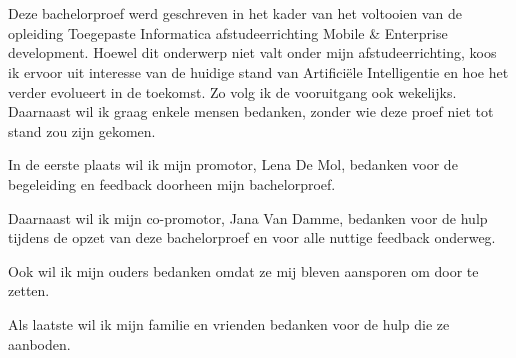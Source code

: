 
\chapter*{}%
\label{ch:voorwoord}


Deze bachelorproef werd geschreven in het kader van het voltooien van de opleiding Toegepaste Informatica afstudeerrichting Mobile \& Enterprise development. Hoewel dit onderwerp niet valt onder mijn afstudeerrichting, koos ik ervoor uit interesse van de huidige stand van Artificiële Intelligentie en hoe het verder evolueert in de toekomst. Zo volg ik de vooruitgang ook wekelijks. Daarnaast wil ik graag enkele mensen bedanken, zonder wie deze proef niet tot stand zou zijn gekomen.

In de eerste plaats wil ik mijn promotor, Lena De Mol, bedanken voor de begeleiding en feedback doorheen mijn bachelorproef.

Daarnaast wil ik mijn co-promotor, Jana Van Damme, bedanken voor de hulp tijdens de opzet van deze bachelorproef en voor alle nuttige feedback onderweg.

Ook wil ik mijn ouders bedanken omdat ze mij bleven aansporen om door te zetten.

Als laatste wil ik mijn familie en vrienden bedanken voor de hulp die ze aanboden.
